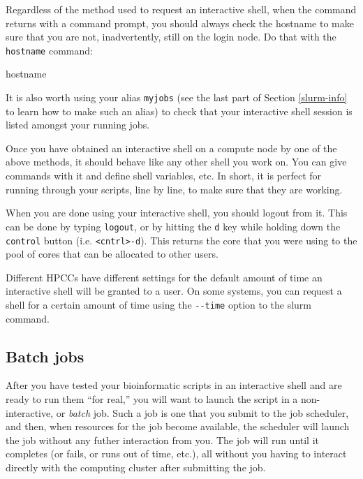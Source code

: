 \documentclass[]{krantz}
\makeatletter
\newenvironment{Shaded}{\begin{snugshade}}{\end{snugshade}}
\newcommand{\FunctionTok}[1]{\textcolor[rgb]{0,0,0}{#1}}
\newenvironment{kframe}{%
\medskip{}
\setlength{\fboxsep}{.8em}
 \def\at@end@of@kframe{}%
 \ifinner\ifhmode%
  \def\at@end@of@kframe{\end{minipage}}%
  \begin{minipage}{\columnwidth}%
 \fi\fi%
 \def\FrameCommand##1{\hskip\@totalleftmargin \hskip-\fboxsep
 \colorbox{shadecolor}{##1}\hskip-\fboxsep
     \hskip-\linewidth \hskip-\@totalleftmargin \hskip\columnwidth}%
 \MakeFramed {\advance\hsize-\width
   \@totalleftmargin\z@ \linewidth\hsize
   \@setminipage}}%
 {\par\unskip\endMakeFramed%
 \at@end@of@kframe}
\renewenvironment{Shaded}{\begin{kframe}}{\end{kframe}}
\makeatother
\begin{document}
Regardless of the method used to request an interactive shell, when the command
returns with a command prompt, you should always check the hostname to make sure
that you are not, inadvertently, still on the login node. Do that with the \texttt{hostname}
command:

\begin{Shaded}
\begin{Highlighting}[]
\FunctionTok{hostname}
\end{Highlighting}
\end{Shaded}

It is also worth using your alias \texttt{myjobs} (see the last part of Section \ref{slurm-info}
to learn how to make such an alias) to check that your interactive shell session is listed amongst
your running jobs.

Once you have obtained an interactive shell on a compute node by one of the above
methods, it should behave like any other shell you work on. You can give commands
with it and define shell variables, etc. In short, it is perfect for running through your
scripts, line by line, to make sure that they are working.

When you are done using your interactive shell, you should logout from it. This can be
done by typing \texttt{logout}, or by hitting the \texttt{d} key while holding down the \texttt{control} button
(i.e. \texttt{\textless{}cntrl\textgreater{}-d}). This returns the core that you were using to the pool of cores that can
be allocated to other users.

Different HPCCs have different settings for the default amount of time an interactive shell will be
granted to a user. On some systems, you can request a shell for a certain amount of time using the
\texttt{-\/-time} option to the slurm command.

\hypertarget{batch-jobs}{%
\subsection{Batch jobs}\label{batch-jobs}}

After you have tested your bioinformatic scripts in an interactive shell and are ready to
run them ``for real,'' you will want to launch the script in a non-interactive, or \emph{batch} job.
Such a job is one that you submit to the job scheduler, and then, when resources for the job become available,
the scheduler will launch the job without any futher interaction from you. The job will run until
it completes (or fails, or runs out of time, etc.), all without you having to interact directly
with the computing cluster after submitting the job.
\end{document}
